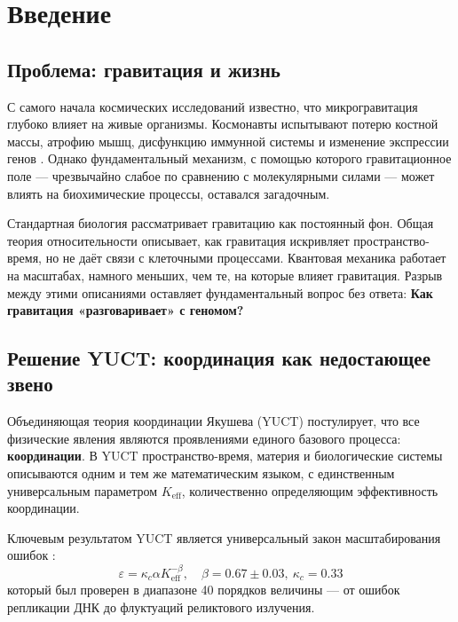 \documentclass[12pt,a4paper]{article}
\theoremstyle{remark}
\newcommand{\Keff}{K_{\mathrm{eff}}}
\newcommand{\kappac}{\kappa_c}
\newcommand{\eps}{\varepsilon}
\begin{document}
	\tableofcontents
	\newpage
	
	\section{Введение}
	\label{sec:intro}
	
	\subsection{Проблема: гравитация и жизнь}
	
	С самого начала космических исследований известно, что микрогравитация глубоко влияет на живые организмы. Космонавты испытывают потерю костной массы, атрофию мышц, дисфункцию иммунной системы и изменение экспрессии генов \cite{NASA-GeneLab, SpaceX-2023}. Однако фундаментальный механизм, с помощью которого гравитационное поле — чрезвычайно слабое по сравнению с молекулярными силами — может влиять на биохимические процессы, оставался загадочным.
	
	Стандартная биология рассматривает гравитацию как постоянный фон. Общая теория относительности описывает, как гравитация искривляет пространство-время, но не даёт связи с клеточными процессами. Квантовая механика работает на масштабах, намного меньших, чем те, на которые влияет гравитация. Разрыв между этими описаниями оставляет фундаментальный вопрос без ответа: \textbf{Как гравитация «разговаривает» с геномом?}
	
	\subsection{Решение YUCT: координация как недостающее звено}
	
	Объединяющая теория координации Якушева (YUCT) постулирует, что все физические явления являются проявлениями единого базового процесса: \textbf{координации}. В YUCT пространство-время, материя и биологические системы описываются одним и тем же математическим языком, с единственным универсальным параметром \(\Keff\), количественно определяющим эффективность координации.
	
	Ключевым результатом YUCT является универсальный закон масштабирования ошибок \cite{AppendixL}:
	\begin{equation}
		\eps = \kappac \alpha \Keff^{-\beta}, \quad \beta = 0.67 \pm 0.03,\ \kappac = 0.33
		\label{eq:universal-scaling}
	\end{equation}
	который был проверен в диапазоне 40 порядков величины — от ошибок репликации ДНК до флуктуаций реликтового излучения.
	
\end{document}

